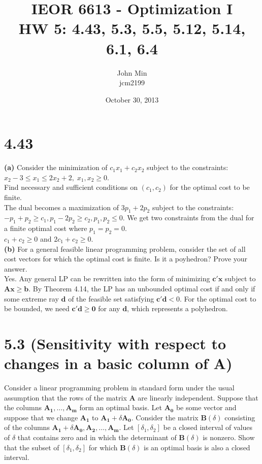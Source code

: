 \documentclass{article}
\begin{document}
\title{IEOR 6613 - Optimization I\\ HW 5:  4.43, 5.3, 5.5, 5.12, 5.14, 6.1, 6.4}

\author{John Min\\ jcm2199}
\date{October 30, 2013}
\maketitle

\section*{4.43}

\textbf{(a)}  Consider the minimization of $c_1 x_1 + c_2 x_2$ subject to the constraints:
$x_2 - 3 \leq x_1 \leq 2 x_2 +2, \; x_1, x_2 \geq 0$. \\
\noindent 
Find necessary and sufficient conditions on $(c_1, c_2)$ for the optimal cost to be finite.\\

\noindent
The dual becomes a maximization of $3 p_1 + 2 p_2$ subject to the constraints: $- p_1 + p_2 \geq c_1, p_1 - 2 p_2 \geq c_2, p_1, p_2 \leq 0$.  We get two constraints from the dual for a finite optimal cost where $p_1 = p_2 = 0.$ \\
$c_1 + c_2 \geq 0$ and $2 c_1 + c_2 \geq 0$. \\

\noindent
\textbf{(b)}
For a general feasible linear programming problem, consider the set of all cost vectors for which the optimal cost is finite.  Is it a poyhedron?  Prove your answer. \\

\noindent
Yes.  Any general LP can be rewritten into the form of minimizing $\mathbf{c'x}$ subject to $\mathbf{Ax \geq b}$.  By Theorem 4.14, the LP has an unbounded optimal cost if and only if some extreme ray $\mathbf{d}$ of the feasible set satisfying $\mathbf{c'd} < 0$.  For the optimal cost to be bounded, we need $\mathbf{c'd \geq 0}$ for any $\mathbf{d}$, which represents a polyhedron. \\

\section*{5.3 (Sensitivity with respect to changes in a basic column of A)}
Consider a linear programming problem in standard form under the usual assumption that the rows of the matrix $\mathbf{A}$ are linearly independent.  Suppose that the columns $\mathbf{A_1, \ldots, A_m}$ form an optimal basis.  Let $\mathbf{A_0}$ be some vector and suppose that we change $\mathbf{A_1}$ to $\mathbf{A_1} + \delta \mathbf{A_0}$.  Consider the matrix $\mathbf{B}(\delta)$ consisting of the columns $\mathbf{A_1} + \delta \mathbf{A_0, A_2, \ldots, A_m}$.  Let $[\delta_1, \delta_2]$ be a closed interval of values of $\delta$ that contains zero and in which the determinant of $\mathbf{B}(\delta)$ is nonzero.  Show that the subset of $[\delta_1, \delta_2]$ for which $\mathbf{B}(\delta)$ is an optimal basis is also a closed interval.  \\
\end{document}
